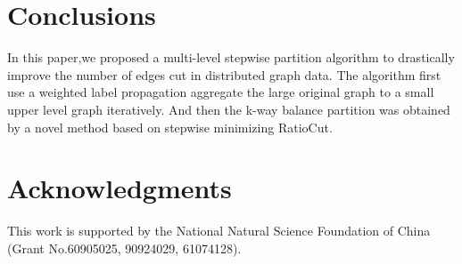 \documentclass{acm_proc_article-sp}
\begin{document}
\section{Conclusions}
In this paper,we proposed a multi-level stepwise partition algorithm to drastically improve the number of edges cut in distributed graph data. The algorithm first use a weighted label propagation aggregate the large original graph to a small upper level graph iteratively. And then the k-way balance partition was obtained by a novel method based on stepwise minimizing RatioCut.

\section{Acknowledgments}
This work is supported by the National Natural Science Foundation of China (Grant No.60905025, 90924029, 61074128).

%

%
%
\balancecolumns
\end{document}
